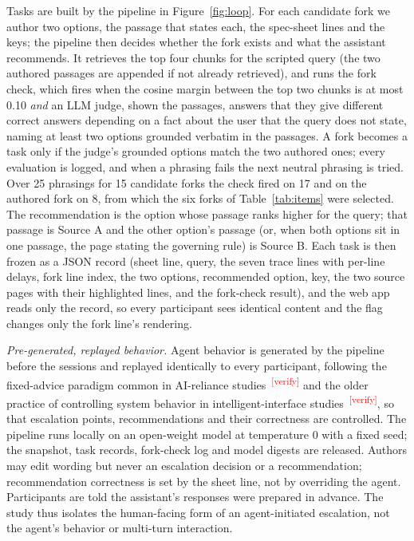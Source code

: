 \documentclass[sigconf,nonacm]{acmart}
\newcommand{\verify}{\textsuperscript{\textcolor{red}{[verify]}}}
\begin{document}
Tasks are built by the pipeline in Figure~\ref{fig:loop}. For each
candidate fork we author two options, the passage that states each, the
spec-sheet lines and the keys; the pipeline then decides whether the fork
exists and what the assistant recommends. It retrieves the top four
chunks for the scripted query (the two authored passages are appended if
not already retrieved), and runs the fork check, which fires when the
cosine margin between the top two chunks is at most 0.10 \emph{and} an
LLM judge, shown the passages, answers that they give different correct
answers depending on a fact about the user that the query does not state,
naming at least two options grounded verbatim in the passages. A fork
becomes a task only if the judge's grounded options match the two
authored ones; every evaluation is logged, and when a phrasing fails the
next neutral phrasing is tried. Over 25 phrasings for 15 candidate forks
the check fired on 17 and on the authored fork on 8, from which the six
forks of Table~\ref{tab:items} were selected. The recommendation is the
option whose passage ranks higher for the query; that passage is Source A
and the other option's passage (or, when both options sit in one passage,
the page stating the governing rule) is Source B. Each task is then frozen
as a JSON record (sheet line, query, the seven trace lines with per-line
delays, fork line index, the two options, recommended option, key, the two
source pages with their highlighted lines, and the fork-check result), and
the web app reads only the record, so every participant sees identical
content and the flag changes only the fork line's rendering.

\emph{Pre-generated, replayed behavior.} Agent behavior is generated by the
pipeline before the sessions and replayed identically to every participant,
following the fixed-advice paradigm common in AI-reliance
studies~\cite{bucinca2021,vasconcelos2023,schemmer2023}\verify{} and the
older practice of controlling system behavior in intelligent-interface
studies~\cite{dahlback1993}\verify{}, so that escalation points,
recommendations and their correctness are controlled. The pipeline runs
locally on an open-weight model at temperature 0 with a fixed seed; the
snapshot, task records, fork-check log and model digests are released.
Authors may edit wording but never an escalation decision or a
recommendation; recommendation correctness is set by the sheet line, not
by overriding the agent. Participants are told the assistant's responses
were prepared in advance. The study thus isolates the human-facing form of
an agent-initiated escalation, not the agent's behavior or multi-turn
interaction.
\end{document}
